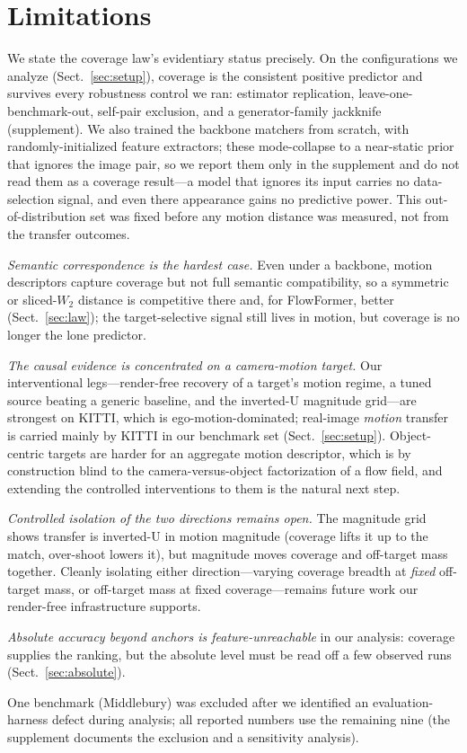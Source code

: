 \section{Limitations}
\label{sec:limits}

We state the coverage law's evidentiary status precisely. On the configurations we
analyze (Sect.~\ref{sec:setup}), coverage is the
consistent positive predictor and survives every robustness control we ran:
estimator replication, leave-one-benchmark-out, self-pair exclusion, and a
generator-family jackknife (supplement). We also trained the backbone matchers
from scratch, with randomly-initialized feature extractors; these mode-collapse to
a near-static prior that ignores the image pair, so we report them only in the
supplement and do not read them as a coverage result---a model that ignores its
input carries no data-selection signal, and even there appearance gains no
predictive power. This out-of-distribution set was fixed before any motion
distance was measured, not from the transfer outcomes.

\noindent\emph{Semantic correspondence is the hardest case.} Even under a
backbone, motion descriptors capture coverage but not full semantic
compatibility, so a symmetric or sliced-$W_2$ distance is competitive there and,
for FlowFormer, better (Sect.~\ref{sec:law}); the target-selective signal still
lives in motion, but coverage is no longer the lone predictor.

\noindent\emph{The causal evidence is concentrated on a camera-motion target.}
Our interventional legs---render-free recovery of a target's motion regime, a
tuned source beating a generic baseline, and the inverted-U magnitude grid---are
strongest on KITTI, which is ego-motion-dominated; real-image \emph{motion}
transfer is carried mainly by KITTI in our benchmark set (Sect.~\ref{sec:setup}).
Object-centric targets are harder for an aggregate motion descriptor, which is by
construction blind to the camera-versus-object factorization of a flow field, and
extending the controlled interventions to them is the natural next step.

\noindent\emph{Controlled isolation of the two directions remains open.} The
magnitude grid shows transfer is inverted-U in motion magnitude (coverage lifts it
up to the match, over-shoot lowers it), but magnitude moves coverage and off-target
mass together. Cleanly isolating either direction---varying coverage breadth at
\emph{fixed} off-target mass, or off-target mass at fixed coverage---remains future
work our render-free infrastructure supports.

\noindent\emph{Absolute accuracy beyond anchors is feature-unreachable} in our
analysis: coverage supplies the ranking, but the absolute \pck{} level must be
read off a few observed runs (Sect.~\ref{sec:absolute}).

One benchmark (Middlebury) was excluded after we identified an evaluation-harness
defect during analysis; all reported numbers use the remaining nine (the
supplement documents the exclusion and a sensitivity analysis).
